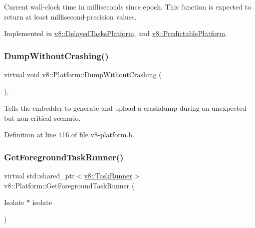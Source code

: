 Current wall-\/clock time in milliseconds since epoch. This function is expected to return at least millisecond-\/precision values. 

Implemented in \mbox{\hyperlink{classv8_1_1DelayedTasksPlatform_a12819f1b8581ce7a19f5a6eabae6c14c}{v8\+::\+Delayed\+Tasks\+Platform}}, and \mbox{\hyperlink{classv8_1_1PredictablePlatform_a910c1b4977cca092adec3d11b3f3b242}{v8\+::\+Predictable\+Platform}}.

\mbox{\label{classv8_1_1Platform_abcbf846fdfc791569f64de675d522cac}} 
\subsubsection{\texorpdfstring{Dump\+Without\+Crashing()}{DumpWithoutCrashing()}}
{\footnotesize\ttfamily virtual void v8\+::\+Platform\+::\+Dump\+Without\+Crashing (\begin{DoxyParamCaption}{ }\end{DoxyParamCaption})\hspace{0.3cm}{\ttfamily [inline]}, {\ttfamily [virtual]}}

Tells the embedder to generate and upload a crashdump during an unexpected but non-\/critical scenario. 

Definition at line 416 of file v8-\/platform.\+h.

\mbox{\label{classv8_1_1Platform_af0d18c6bbefa133c5d11ec8a460d0278}} 
\subsubsection{\texorpdfstring{Get\+Foreground\+Task\+Runner()}{GetForegroundTaskRunner()}}
{\footnotesize\ttfamily virtual std\+::shared\+\_\+ptr$<$\mbox{\hyperlink{classv8_1_1TaskRunner}{v8\+::\+Task\+Runner}}$>$ v8\+::\+Platform\+::\+Get\+Foreground\+Task\+Runner (\begin{DoxyParamCaption}\item[{Isolate $\ast$}]{isolate }\end{DoxyParamCaption})\hspace{0.3cm}{\ttfamily [pure virtual]}}


